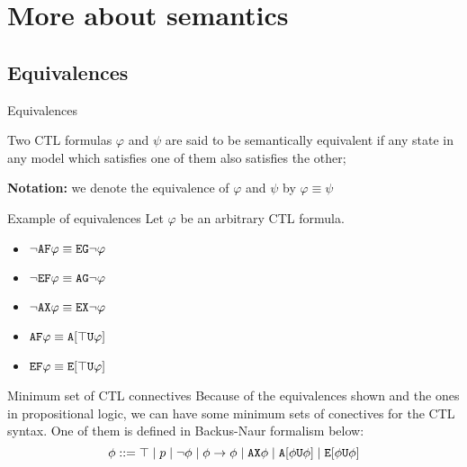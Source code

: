\section{More about semantics}
\subsection{Equivalences}

\begin{frame}{Equivalences}
	\begin{definition}
		Two CTL formulas $\varphi$ and $\psi$ are said to be \alert{semantically	equivalent} if any state in any model which satisfies one of them also satisfies the other; 
	\end{definition}\pause
	\textbf{Notation:} we denote the equivalence of $\varphi$ and $\psi$ by $\varphi \equiv \psi$
\end{frame}

\begin{frame}{Example of equivalences}
    Let $\varphi$ be an arbitrary CTL formula.
        
    \begin{itemize}
        \item
        {
            $\neg \texttt{A}\texttt{F} \varphi \equiv \texttt{E}\texttt{G} \neg \varphi $    
            \pause
        }
        \item
        {
            $\neg \texttt{E}\texttt{F} \varphi \equiv \texttt{A}\texttt{G} \neg \varphi$    
            \pause    
        }
        \item
        {
            $\neg \texttt{A}\texttt{X} \varphi \equiv \texttt{E}\texttt{X} \neg \varphi$    
            \pause
        }
        \item
        {
            $\texttt{A}\texttt{F}\varphi \equiv \texttt{A}[\top \texttt{U}\varphi]$    
            \pause
        }
        \item
        {
            $\texttt{E}\texttt{F} \varphi \equiv \texttt{E}[\top \texttt{U}\varphi]$
        }
    \end{itemize}
\end{frame}

\begin{frame}{Minimum set of CTL connectives}
    Because of the equivalences shown and the ones in propositional logic, we can have some minimum sets of conectives for the CTL syntax. One of them is defined in Backus-Naur formalism below:
    $$\phi ::=  \top \; | \; p \; | \; \neg \phi \; | \; \phi \to \phi \; | \; \texttt{A}\texttt{X} \phi \; | \;  \texttt{A}[\phi\texttt{U}\phi] \; | \; \texttt{E}[\phi\texttt{U}\phi]$$
\end{frame}